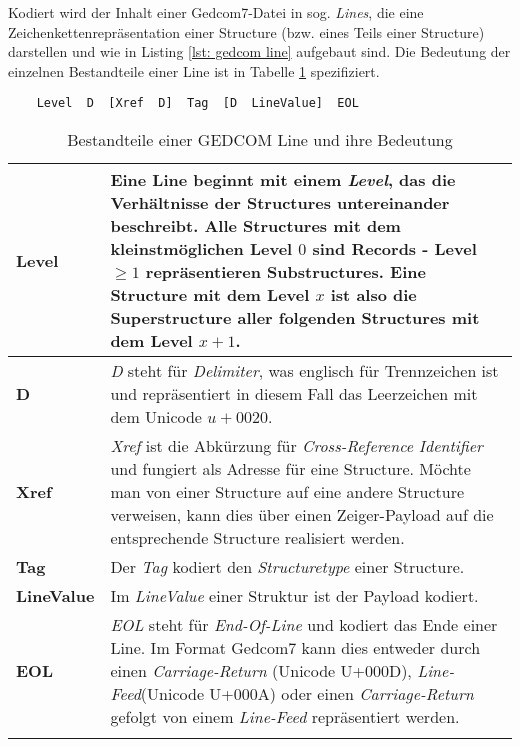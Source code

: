 {Kodiert wird der Inhalt einer Gedcom7-Datei in sog. \textit{Lines}, die eine Zeichenkettenrepräsentation einer Structure (bzw. eines Teils einer Structure) darstellen und wie in Listing \ref{lst: gedcom line} aufgebaut sind. Die Bedeutung der einzelnen Bestandteile einer Line ist in Tabelle \ref{tab: gedcom line} spezifiziert.
\vspace{1em}
\begin{lstlisting}
	Level  D  [Xref  D]  Tag  [D  LineValue]  EOL
\end{lstlisting}
\label{lst: gedcom line}
\newpage
\bgroup
\def\arraystretch{1.5}%
\setlength{\tabcolsep}{18pt}
\begin{longtable}{|p{2cm}|p{10cm}|}
	\hline
	\textbf{Level} & Eine Line beginnt mit einem \textit{Level}, das die Verhältnisse der Structures untereinander beschreibt. Alle Structures mit dem kleinstmöglichen Level $0$ sind Records - Level $\ge1$ repräsentieren Substructures. Eine Structure mit dem Level $x$ ist also die Superstructure aller folgenden Structures mit dem Level $x+1$. \\
	\hline
	\textbf{D} & \textit{D} steht für \textit{Delimiter}, was englisch für Trennzeichen ist und repräsentiert in diesem Fall das Leerzeichen mit dem Unicode $u+0020$. \\
	\hline
	\textbf{Xref} & \textit{Xref} ist die Abkürzung für \textit{Cross-Reference Identifier} und fungiert als Adresse für eine Structure. Möchte man von einer Structure auf eine andere Structure verweisen, kann dies über einen Zeiger-Payload auf die entsprechende Structure realisiert werden.\\
	\hline
	\textbf{Tag} & Der \textit{Tag} kodiert den \textit{Structuretype} einer Structure.\\
	\hline
	\textbf{LineValue} & Im \textit{LineValue} einer Struktur ist der Payload kodiert.\\
	\hline
	\textbf{EOL} & \textit{EOL} steht für \textit{End-Of-Line} und kodiert das Ende einer Line. Im Format Gedcom7 kann dies entweder durch einen \textit{Carriage-Return} (Unicode U+000D), \textit{Line-Feed}(Unicode U+000A) oder einen \textit{Carriage-Return} gefolgt von einem \textit{Line-Feed} repräsentiert werden.\\
	\hline
	\caption{Bestandteile einer GEDCOM Line und ihre Bedeutung} %
	\label{tab: gedcom line}
\end{longtable}
}
